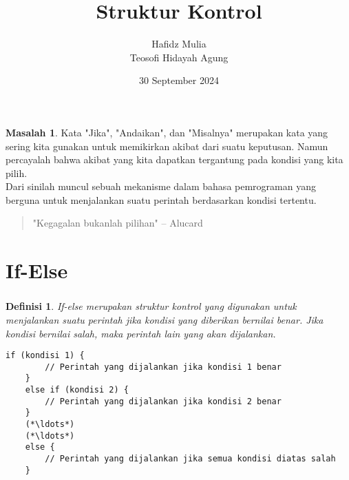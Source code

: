\documentclass[aspectratio=169]{beamer}
\author[Tew \& Haf]{Hafidz Mulia\\Teosofi Hidayah Agung}
\date{30 September 2024}
\title[Alpro 1 - Week 4]{Struktur Kontrol}
\institute[Matematika ITS]{Departemen Matematika\\ Institut Teknologi Sepuluh Nopember}
\newtheorem*{definisi}{Definisi}
\theoremstyle{definition}
\newtheorem*{masalah}{Masalah}
\begin{document}
    {
    \begin{frame}
        \titlepage
    \end{frame}
    }

    {
    \begin{frame}
        \begin{masalah}
            Kata "Jika", "Andaikan", dan "Misalnya" merupakan kata yang sering kita gunakan untuk memikirkan akibat dari suatu keputusan. Namun percayalah bahwa akibat yang kita dapatkan tergantung pada kondisi yang kita pilih.\\
            \vspace*{0.2cm}
            Dari sinilah muncul sebuah mekanisme dalam bahasa pemrograman yang berguna untuk menjalankan suatu perintah berdasarkan kondisi tertentu. 
        \end{masalah}
        \begin{exampleblock}{}
            \begin{quote}
                "Kegagalan bukanlah pilihan" -- Alucard
            \end{quote}
        \end{exampleblock}
    \end{frame}
    }
    
    \section{If-Else}
    \begin{frame}[fragile]
        \frametitle{\insertsection}
        \begin{definisi}
            If-else merupakan struktur kontrol yang digunakan untuk menjalankan suatu perintah jika kondisi yang diberikan bernilai benar. Jika kondisi bernilai salah, maka perintah lain yang akan dijalankan.
        \end{definisi}
        \begin{lstlisting}[numbers=none]
    if (kondisi 1) {
        // Perintah yang dijalankan jika kondisi 1 benar
    }
    else if (kondisi 2) {
        // Perintah yang dijalankan jika kondisi 2 benar
    }
    (*\ldots*)
    (*\ldots*)
    else {
        // Perintah yang dijalankan jika semua kondisi diatas salah
    }
        \end{lstlisting}
    \end{frame}
\end{document}
